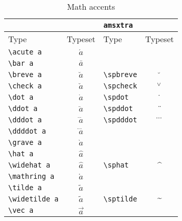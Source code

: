 \documentclass{amsart}
\begin{document}
\begin{table}[h]
    \begin{center}
        \begin{tabular}{lclc}
            \hline
            & &\texttt{amsxtra}\\\hline
            Type &Typeset &Type &Typeset\\\hline
            \verb+\acute a+ &$\acute a$\\
            \verb+\bar a+ &$\bar a$\\
            \verb+\breve a+ &$\breve a$ &\verb+\spbreve+ &$\spbreve$\\
            \verb+\check a+ &$\check a$ &\verb+\spcheck+ &$\spcheck$\\
            \verb+\dot a+ &$\dot a$ &\verb+\spdot+ &$\spdot$\\
            \verb+\ddot a+ &$\ddot a$ &\verb+\spddot+ &$\spddot$\\
            \verb+\dddot a+ &$\dddot a$ &\verb+\spdddot+ &$\spdddot$\\
            \verb+\ddddot a+ &$\ddddot a$\\
            \verb+\grave a+ &$\grave a$\\
            \verb+\hat a+ &$\hat a$\\
            \verb+\widehat a+ &$\widehat a$ &\verb+\sphat+ &$\sphat$\\
            \verb+\mathring a+ &$\mathring a$\\
            \verb+\tilde a+ &$\tilde a$\\
            \verb+\widetilde a+ &$\widetilde a$ &\verb+\sptilde+ &$\sptilde$\\
            \verb+\vec a+ &$\vec a$\\
        \end{tabular}
        \caption{Math accents}
    \end{center}
\end{table}
\end{document}
